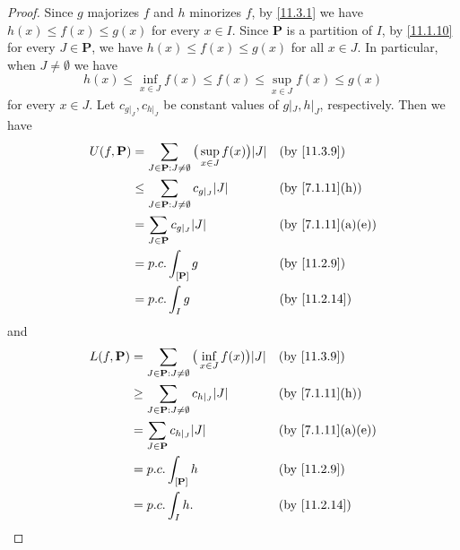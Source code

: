 \begin{proof}
  Since \(g\) majorizes \(f\) and \(h\) minorizes \(f\), by \cref{11.3.1} we have \(h(x) \leq f(x) \leq g(x)\) for every \(x \in I\).
  Since \(\mathbf{P}\) is a partition of \(I\), by \cref{11.1.10} for every \(J \in \mathbf{P}\), we have \(h(x) \leq f(x) \leq g(x)\) for all \(x \in J\).
  In particular, when \(J \neq \emptyset\) we have
  \[
    h(x) \leq \inf_{x \in J} f(x) \leq f(x) \leq \sup_{x \in J} f(x) \leq g(x)
  \]
  for every \(x \in J\).
  Let \(c_{g|_J}, c_{h|_J}\) be constant values of \(g|_J, h|_J\), respectively.
  Then we have
  \begin{align*}
    U(f, \mathbf{P}) & = \sum_{J \in \mathbf{P} : J \neq \emptyset} \big(\sup_{x \in J} f(x)\big) \abs{J} &  & \by{11.3.9}                     \\
                     & \leq \sum_{J \in \mathbf{P} : J \neq \emptyset} c_{g|_J} \abs{J}                   &  & \text{(by \cref{7.1.11}(h))}    \\
                     & = \sum_{J \in \mathbf{P}} c_{g|_J} \abs{J}                                         &  & \text{(by \cref{7.1.11}(a)(e))} \\
                     & = p.c. \int_{[\mathbf{P}]} g                                                       &  & \by{11.2.9}                     \\
                     & = p.c. \int_I g                                                                    &  & \by{11.2.14}
  \end{align*}
  and
  \begin{align*}
    L(f, \mathbf{P}) & = \sum_{J \in \mathbf{P} : J \neq \emptyset} \big(\inf_{x \in J} f(x)\big) \abs{J} &  & \by{11.3.9}                     \\
                     & \geq \sum_{J \in \mathbf{P} : J \neq \emptyset} c_{h|_J} \abs{J}                   &  & \text{(by \cref{7.1.11}(h))}    \\
                     & = \sum_{J \in \mathbf{P}} c_{h|_J} \abs{J}                                         &  & \text{(by \cref{7.1.11}(a)(e))} \\
                     & = p.c. \int_{[\mathbf{P}]} h                                                       &  & \by{11.2.9}                     \\
                     & = p.c. \int_I h.                                                                   &  & \by{11.2.14}
  \end{align*}
\end{proof}

